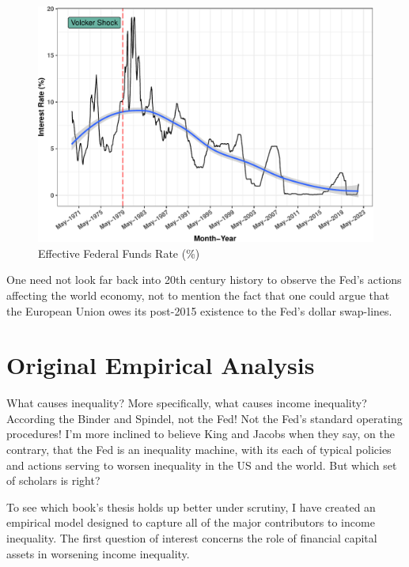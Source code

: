 \documentclass[
  12pt,
]{article}
\begin{document}
\begin{figure}[ht]

{\centering \includegraphics{fed-paper_files/figure-latex/fed_funds-1} 

}

\caption{\label{fed_funds_rate}Effective Federal Funds Rate (\%)}\label{fig:fed_funds}
\end{figure}

One need not look far back into 20th century history to observe the
Fed's actions affecting the world economy, not to mention the fact that
one could argue that the European Union owes its post-2015 existence to
the Fed's dollar swap-lines.

\hypertarget{original-empirical-analysis}{%
\section{Original Empirical
Analysis}\label{original-empirical-analysis}}

What causes inequality? More specifically, what causes income
inequality? According the Binder and Spindel, not the Fed! Not the Fed's
standard operating procedures! I'm more inclined to believe King and
Jacobs when they say, on the contrary, that the Fed is an inequality
machine, with its each of typical policies and actions serving to worsen
inequality in the US and the world. But which set of scholars is right?

To see which book's thesis holds up better under scrutiny, I have
created an empirical model designed to capture all of the major
contributors to income inequality. The first question of interest
concerns the role of financial capital assets in worsening income
inequality.
\end{document}
